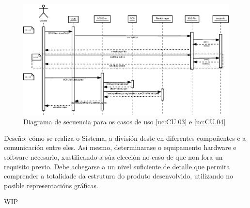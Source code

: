 \begin{figure}
 \centering
 \includegraphics[width=\textwidth]{images/seq2.eps}
 \caption{Diagrama de secuencia para os casos de uso \ref{uc:CU.03} e \ref{uc:CU.04}}
 \label{fig:diaSeq2}
\end{figure}

Deseño: cómo se realiza o Sistema, a división deste en diferentes compoñentes e a comunicación entre eles. Así mesmo, determinarase o equipamento hardware e software necesario, xustificando a súa elección no caso de que non fora un requisito previo. Debe achegarse a un nivel suficiente de detalle que permita comprender a totalidade da estrutura do produto desenvolvido, utilizando no  posible representacións gráficas.

WIP